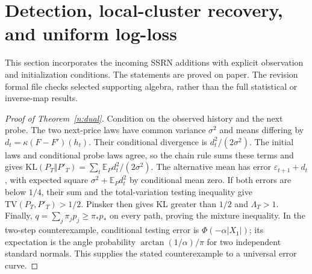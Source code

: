 \documentclass[12pt]{article}
\theoremstyle{definition}
\theoremstyle{remark}
\begin{document}
\section{Detection, local-cluster recovery, and uniform log-loss}\label{app:incoming}

This section incorporates the incoming SSRN additions with explicit observation and initialization conditions. The statements are proved on paper. The revision formal file checks selected supporting algebra, rather than the full statistical or inverse-map results.

\begin{proof}[Proof of Theorem~\ref{n:dual}]
Condition on the observed history and the next probe. The two next-price laws have common variance $\sigma^2$ and means differing by $d_t=\kappa(F-F')(h_t)$. Their conditional divergence is $d_t^2/(2\sigma^2)$. The initial laws and conditional probe laws agree, so the chain rule sums these terms and gives $\mathrm{KL}(P_T\Vert P'_T)=\sum_t\mathbb E_Pd_t^2/(2\sigma^2)$. The alternative mean has error $\varepsilon_{t+1}+d_t$, with expected square $\sigma^2+\mathbb E_Pd_t^2$ by conditional mean zero. If both errors are below $1/4$, their sum and the total-variation testing inequality give $\mathrm{TV}(P_T,P'_T)>1/2$. Pinsker then gives KL greater than $1/2$ and $\Lambda_T>1$. Finally, $q=\sum_j\pi_jp_j\ge\pi_*p_*$ on every path, proving the mixture inequality. In the two-step counterexample, conditional testing error is $\Phi(-\alpha|X_1|)$; its expectation is the angle probability $\arctan(1/\alpha)/\pi$ for two independent standard normals. This supplies the stated counterexample to a universal error curve.
\end{proof}
\end{document}
